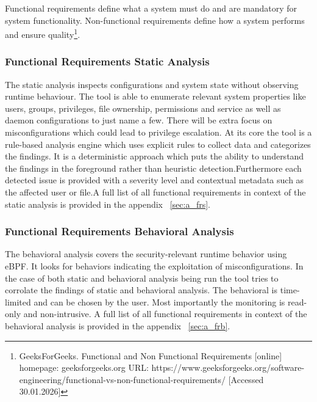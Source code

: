 Functional requirements define what a system must do and are mandatory for system functionality. Non-functional requirements define how a system performs and ensure quality\footnote{GeeksForGeeks. Functional and Non Functional Requirements [online] homepage: geeksforgeeks.org URL: https://www.geeksforgeeks.org/software-engineering/functional-vs-non-functional-requirements/ [Accessed 30.01.2026]}.

\subsubsection{Functional Requirements Static Analysis}

The static analysis inspects configurations and system state without observing runtime behaviour. The tool is able to enumerate relevant system properties like users, groups, privileges, file ownership, permissions and service as well as daemon configurations to just name a few. There will be extra focus on misconfigurations which could lead to privilege escalation. \newline\newline At its core the tool is a rule-based analysis engine which uses explicit rules to collect data and categorizes the findings. It is a deterministic approach which puts the ability to understand the findings in the foreground rather than heuristic detection.\newline\newline Furthermore each detected issue is provided with a severity level and contextual metadata such as the affected user or file.\newline\newline A full list of all functional requirements in context of the static analysis is provided in the appendix ~\ref{sec:a_frs}.

\subsubsection{Functional Requirements Behavioral Analysis}

The behavioral analysis covers the security-relevant runtime behavior using eBPF. It looks for behaviors indicating the exploitation of misconfigurations. In the case of both static and behavioral analysis being run the tool tries to corrolate the findings of static and behavioral analysis. The behavioral is time-limited and can be chosen by the user. Most importantly the monitoring is read-only and non-intrusive. \newline\newline A full list of all functional requirements in context of the behavioral analysis is provided in the appendix ~\ref{sec:a_frb}.

